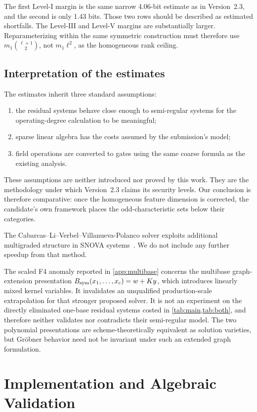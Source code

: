 \documentclass[runningheads]{llncs}
\newcommand{\SNOVA}{\textsf{SNOVA}}
\begin{document}
The first Level-I margin is the same narrow 4.06-bit estimate as in Version~2.3, and the second is only 1.43 bits.  Those two rows should be described as estimated shortfalls.  The Level-III and Level-V margins are substantially larger.  Reparameterizing within the same symmetric construction must therefore use $m_1\binom{\ell+1}{2}$, not $m_1\ell^2$, as the homogeneous rank ceiling.

\subsection{Interpretation of the estimates}

The estimates inherit three standard assumptions:
\begin{enumerate}
\item the residual systems behave close enough to semi-regular systems for the operating-degree calculation to be meaningful;
\item sparse linear algebra has the costs assumed by the submission's model;
\item field operations are converted to gates using the same coarse formula as the existing analysis.
\end{enumerate}
These assumptions are neither introduced nor proved by this work.  They are the methodology under which Version~2.3 claims its security levels.  Our conclusion is therefore comparative: once the homogeneous feature dimension is corrected, the candidate's own framework places the odd-characteristic sets below their categories.

The Cabarcas--Li--Verbel--Villanueva-Polanco solver exploits additional multigraded structure in \SNOVA{} systems~\cite{Cabarcas2025SNOVA}.  We do not include any further speedup from that method.

The scaled F4 anomaly reported in \cref{app:multibase} concerns the multibase
graph-extension presentation $B_{\rm sym}(x_1,\ldots,x_c)=w+Ky$, which
introduces linearly mixed kernel variables.  It invalidates an unqualified
production-scale extrapolation for that stronger proposed solver.  It is not an
experiment on the directly eliminated one-base residual systems costed in
\cref{tab:main,tab:both}, and therefore neither validates nor contradicts their
semi-regular model.  The two polynomial presentations are scheme-theoretically
equivalent as solution varieties, but Gr\"obner behavior need not be invariant
under such an extended graph formulation.

\section{Implementation and Algebraic Validation}\label{sec:validation}
\end{document}
